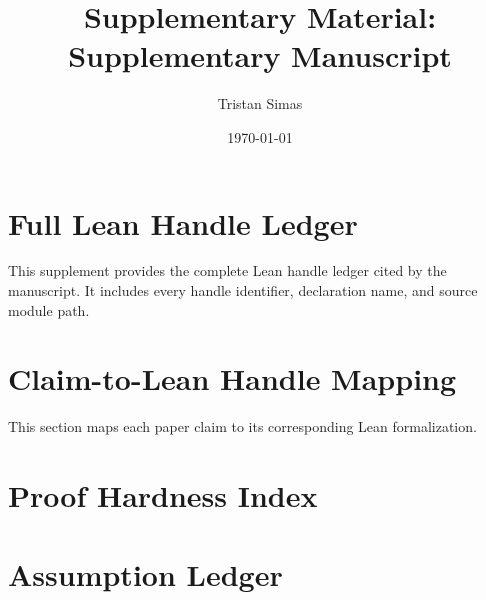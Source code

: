 \documentclass[11pt]{article}
\providecommand{\PaperTitleAuto}{Supplementary Manuscript}
\begin{document}
\title{Supplementary Material: \PaperTitleAuto}
\author{Tristan Simas}
\date{\today}
\maketitle

\section{Full Lean Handle Ledger}

This supplement provides the complete Lean handle ledger cited by the manuscript.
It includes every handle identifier, declaration name, and source module path.


\section{Claim-to-Lean Handle Mapping}

This section maps each paper claim to its corresponding Lean formalization.


\section{Proof Hardness Index}


\section{Assumption Ledger}

\end{document}
